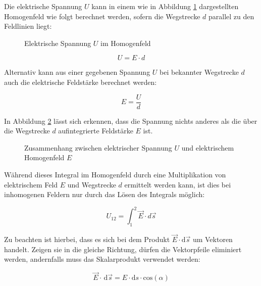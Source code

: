 \begin{frame}
{	Die elektrische Spannung $U$ kann in einem wie in Abbildung \ref{fig:spannunghomogen} dargestellten Homogenfeld wie folgt berechnet werden,
	  sofern die Wegstrecke $d$ parallel zu den Feldlinien liegt:

	 
	  \begin{figure}[h!]
		\centering
		
		\caption{Elektrische Spannung $U$ im Homogenfeld}
		\label{fig:spannunghomogen}
	\end{figure}

	 



	\begin{equation}
	 U = E \cdot d
	\end{equation}

	
	Alternativ kann aus einer gegebenen Spannung $U$ bei bekannter Wegstrecke $d$ auch die elektrische Feldstärke berechnet werden:
	
	\begin{equation}
		E = \frac{U}{d}
	   \end{equation}

	In Abbildung \ref{fig:spannunggraph} lässt sich erkennen, dass die Spannung nichts anderes als die über die Wegstrecke $d$ aufintegrierte Feldstärke $E$ ist.
	

	\begin{figure}[h!]
		\centering
		
		\caption{Zusammenhang zwischen elektrischer Spannung $U$ und elektrischem Homogenfeld $E$}
		\label{fig:spannunggraph}
	\end{figure}



	Während dieses Integral im Homogenfeld durch eine Multiplikation von elektrischem Feld $E$ und Wegstrecke $d$ ermittelt
	werden kann, ist dies bei inhomogenen Feldern nur durch das Lösen des Integrals möglich:
	
	\begin{equation}
		U_{12} =\int_{1}^{2} \vec{E} \cdot d \vec{s}
	\end{equation}

	Zu beachten ist hierbei, dass es sich bei dem Produkt $\vec{E} \cdot \mathrm{d} \vec{s}$ um Vektoren handelt. Zeigen sie in die
	gleiche Richtung, dürfen die Vektorpfeile eliminiert werden, andernfalls muss das Skalarprodukt verwendet werden: 


		\begin{equation*}
			\vec{E} \cdot \, \mathrm{d} \vec{s} =  E \cdot \mathrm{d} s \cdot \mathrm{cos} (\alpha)
		\end{equation*}


}
\end{frame}

